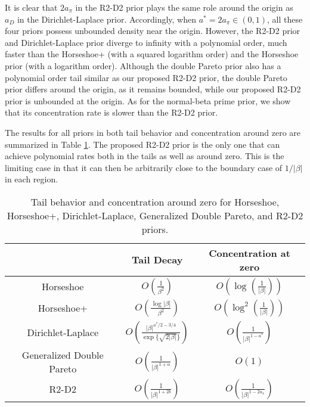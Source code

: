 \documentclass[12pt]{article}
\begin{document}
It is clear that  $2a_\pi$ in the R2-D2  prior  plays the same role around the  origin as   $a_D$ in the Dirichlet-Laplace prior.
Accordingly,   when   $a^\ast=2a_\pi\in(0,1)$,    all  these  four priors   possess unbounded density near the origin. However,  the R2-D2  prior  and Dirichlet-Laplace  prior    diverge
to infinity  with a   polynomial order, much  faster than the Horseshoe+ (with a squared logarithm order)  and the Horseshoe prior (with a logarithm order).   Although the double Pareto prior also has a polynomial order tail similar as our proposed  R2-D2  prior,  the double Pareto prior   differs around the origin, as it remains bounded, while  our proposed R2-D2 prior is unbounded at the origin.   As for the normal-beta prime prior, we show that its concentration rate is slower than the R2-D2 prior.

The  results for all priors in both tail behavior and concentration around zero are summarized in  Table \ref{table-asymptotics}. The proposed R2-D2 prior is the only one that can achieve polynomial rates both in the tails as well as around zero. This is the limiting case in that it can then be arbitrarily close to the boundary case of $1/{|\beta|}$ in each region.

\begin{table} [h!]
	\renewcommand{\arraystretch}{1.5}
	\begin{center}
		\normalsize\addtolength{\tabcolsep}{-2pt}
		\begin{tabular}{| c| c |c| }
			\hline
			& Tail Decay & Concentration at zero  		\\
			\hline
			Horseshoe &  $O\left(\frac{1}{\beta^2}\right)$ &
			$O\left(\log(\frac{1}{|\beta|})\right)$   \\ \hline
			Horseshoe+ &  $O\left(\frac{\log |\beta|}{\beta^2}\right)$
			& $O\left(\log^2(\frac{1}{|\beta|})\right)$   \\	\hline
			Dirichlet-Laplace & $O\left( \frac{|\beta|^{a^\ast/2-3/4}}{  \exp\{ \sqrt{2|\beta|}\} } \right)$ & $O\left(\frac{1}{|\beta|^{1-a^\ast}}\right)$   \\ \hline
			Generalized Double Pareto &	$O\left( \frac{1}{|\beta|^{1+\alpha} }\right)$ & $O (1)$ \\ \hline
			R2-D2 &  	$O\left( \frac{1}{|\beta|^{1+2b} }\right)$ &
			$O\left(\frac{1}{|\beta|^{1-2a_\pi}}\right) $  \\
			\hline
		\end{tabular}
	\end{center}
	\caption {Tail behavior and concentration around zero for Horseshoe, Horseshoe+,  Dirichlet-Laplace, Generalized Double Pareto, and R2-D2 priors.}
\label{table-asymptotics}
\end{table}
\end{document}
